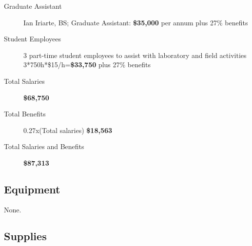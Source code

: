 \documentclass[14pt,english,letterpaper]{scrartcl}
\begin{document}
\begin{description}
	\item[Graduate Assistant] Ian Iriarte, BS; Graduate Assistant: \textbf{\$35,000} per annum plus 27\% benefits
	
	\item[Student Employees]  3 part-time student employees to assist with laboratory and field activities 3*750h*\$15/h=\textbf{\$33,750} plus 27\% benefits
	
	\item[Total Salaries] \textbf{\$68,750}
		
	\item[Total Benefits] 0.27x(Total salaries) \textbf{\$18,563}
		
	\item[Total Salaries and Benefits]  \textbf{\$87,313}
			
\end{description}

\subsection{Equipment} 


None.

\subsection{Supplies} 

\end{document}
